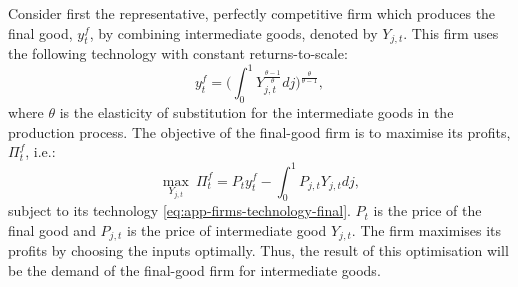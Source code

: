 \documentclass[a4paper,12pt]{article} %
\numberwithin{equation}{section} %
\numberwithin{figure}{section}
\numberwithin{table}{section}
\begin{document}
\begin{refsection}
\begin{appendices}
Consider first the representative, perfectly competitive firm which produces the final good, $y_t^f$, by combining intermediate goods, denoted by $Y_{j,t}$. This firm uses the following technology with constant returns-to-scale:
\begin{equation}
    y_t^f = \Bigg( \int_0^1 Y_{j,t}^{\frac{\theta - 1}{\theta}} dj \Bigg)^{\frac{\theta}{\theta-1}}, \label{eq:app-firms-technology-final}
\end{equation}
where $\theta$ is the elasticity of substitution for the intermediate goods in the production process. The objective of the final-good firm is to maximise its profits, $\Pi_t^f$, i.e.:
\begin{equation*}
    \max_{Y_{j,t}} \ \Pi_t^f = P_t y_t^f - \int_0^1 P_{j,t} Y_{j,t} dj,
\end{equation*}
subject to its technology \eqref{eq:app-firms-technology-final}. $P_t$ is the price of the final good and $P_{j,t}$ is the price of intermediate good $Y_{j,t}$. The firm maximises its profits by choosing the inputs optimally. Thus, the result of this optimisation will be the demand of the final-good firm for intermediate goods.  


\end{appendices}
\end{refsection}
\end{document}
